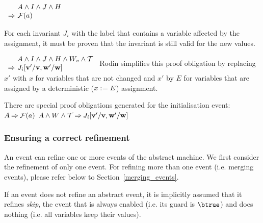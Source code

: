   {$\begin{array}{r@{\ }l}
      & A \land I \land J \land H \\
      \limp & \actfis(a)
    \end{array}$}

For each invariant $J_i$ with the label  
  that contains a variable affected by the assignment, it must be proven
  that the invariant is still valid for the new values.

  {}%
  {$\begin{array}{r@{\ }l}
      & A \land I \land J \land H \land W_{v} \land \concbeforeafter \\
      \limp & J_i[\absvariables'/\absvariables,\concvariables'/\concvariables]
    \end{array}$}
  Rodin simplifies this proof obligation by replacing $x'$ with $x$ for variables that are not
  changed and $x'$ by $E$
  for variables that are assigned by a deterministic ($x \mathrel{:\mkern1mu=} E$) assignment.

There are special proof obligations generated for the initialisation event:
  {$A \mathbin\Rightarrow \mathcal{F}(a)$}
  {}%
  {$A \land W \land \mathcal{T} \mathbin\Rightarrow J_i[\mathbf{v}'/\mathbf{v},\mathbf{w}'/\mathbf{w}]$}

\subsubsection{Ensuring a correct refinement}
\label{refinement_proof_obligations}
An event can refine one or more events of the abstract machine.
We first consider the refinement of only one event. 
For refining more than one event (i.e. merging events), please refer below to Section~\ref{merging_events}.

If an event does not refine an abstract event, it is implicitly assumed that it refines \emph{skip}, the
  event that is always enabled (i.e. its guard is $\btrue$) and does nothing (i.e. all variables keep their
  values).

